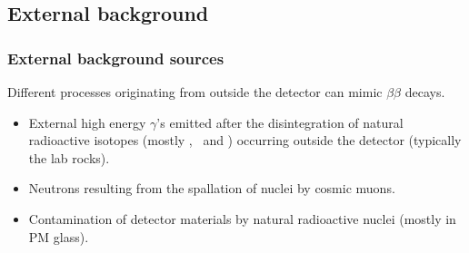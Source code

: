 \subsection{External background}
\label{subsec:SNexternal_bkg}

\subsubsection*{External background sources}

Different processes originating from outside the detector can mimic $\beta\beta$ decays.
\begin{itemize}
\item External high energy $\gamma$'s emitted after the disintegration of natural radioactive isotopes (mostly \Tl, \Bi\ and \K) occurring outside the detector (typically the lab rocks).
\item Neutrons resulting from the spallation of nuclei by cosmic muons.
\item Contamination of detector materials by natural radioactive nuclei (mostly in PM glass).
\end{itemize}

